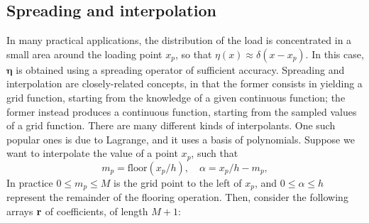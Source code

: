 \documentclass[11pt,twoside,a4paper,english]{book}
\begin{document}
\subsection{Spreading and interpolation}
In many practical applications, the distribution of the load is concentrated in a small area around the loading point $x_p$, so that $\eta(x) \approx \delta(x-x_p)$. In this case, $\boldsymbol \eta$ is obtained using a spreading operator of sufficient accuracy. Spreading and interpolation are closely-related concepts, in that the former consists in yielding a grid function, starting from the knowledge of a given continuous function; the former instead produces a continuous function, starting from the sampled values of a grid function. There are many different kinds of interpolants. One such popular ones is due to Lagrange, and it uses a basis of polynomials. Suppose we want to interpolate the value of a point $x_p$, such that 
\begin{equation}
m_p = \text{floor}(x_p/h), \quad \alpha = x_p/h - m_p,
\end{equation}
In practice $0\leq m_p\leq M$ is the grid point to the left of $x_p$, and $0\leq \alpha \leq h$ represent the remainder of the flooring operation. Then, consider the following arrays ${\bf r}$ of coefficients, of length $M+1$:
\end{document}
